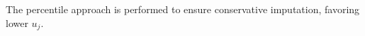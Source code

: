 \documentclass[conference,compsoc]{IEEEtran}
\newcommand{\el}[1]{_{#1}}
\begin{document}
The percentile approach is performed to ensure conservative imputation, favoring lower $u_j$.
%
% 
% 
% 
% 
% 
% 
\end{document}
